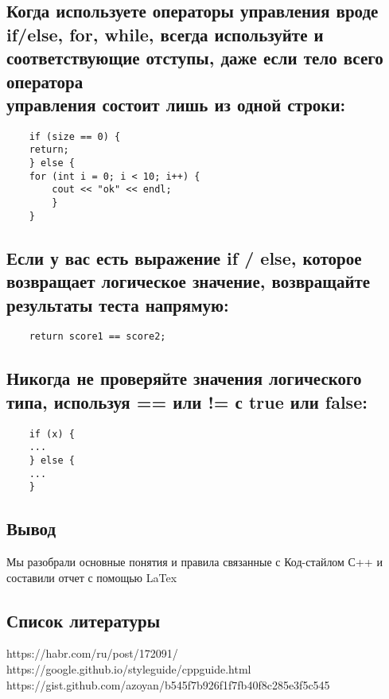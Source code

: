 \documentclass{article}
\begin{document}
        \subsection{Когда используете операторы управления вроде if/else, for, while, всегда используйте {} и соответствующие отступы, даже если тело всего оператора \\управления состоит лишь из одной строки:}
            \begin{lstlisting}
    if (size == 0) {
    return;
    } else {
    for (int i = 0; i < 10; i++) {
        cout << "ok" << endl;
        }
    }
            \end{lstlisting}
            
        \subsection{Если у вас есть выражение if / else, которое\\ возвращает логическое значение, возвращайте результаты теста напрямую:}
            \begin{lstlisting}
    return score1 == score2;
            \end{lstlisting}
            
            
\newpage
        \subsection{Никогда не проверяйте значения логического типа, используя == или != с true или false:}
            \begin{lstlisting}
    if (x) {
    ...
    } else {
    ...
    }
            \end{lstlisting}
            
\newpage
    \begin{center}
        \section*{Вывод}
    \end{center} 
    
    Мы разобрали основные понятия и правила связанные с Код-стайлом С++ и составили отчет с помощью LaTex

\newpage

    \begin{center}
        \section*{Список литературы}
    \end{center} 
    
\begin{thebibliography}{7}
     https://habr.com/ru/post/172091/
     https://google.github.io/styleguide/cppguide.html
     https://gist.github.com/azoyan/b545f7b926f1f7fb40f8c285e3f5c545
\end{thebibliography}

        
\end{document}
